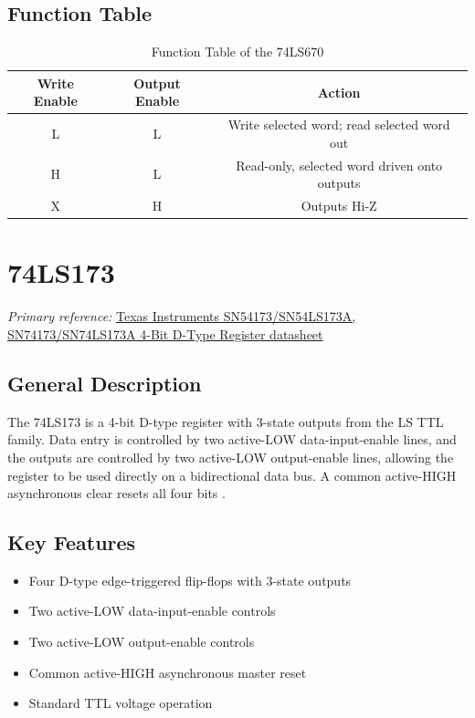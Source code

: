 \documentclass[12pt,a4paper]{report}
\newcommand{\datasheetref}[2]{%
  \noindent\textit{Primary reference:} \href{#2}{#1}%
  \par\vspace{0.6em}
}
\begin{document}
\section{Function Table}
\begin{table}[H]
\centering
\begin{tabular}{@{}ccc@{}}
\toprule
\textbf{Write Enable} & \textbf{Output Enable} & \textbf{Action} \\
\midrule
L & L & Write selected word; read selected word out \\
H & L & Read-only, selected word driven onto outputs \\
X & H & Outputs Hi-Z \\
\bottomrule
\end{tabular}
\caption{Function Table of the 74LS670}
\end{table}

\chapter{74LS173}
\datasheetref{Texas Instruments SN54173/SN54LS173A, SN74173/SN74LS173A 4-Bit D-Type Register datasheet}{https://www.ti.com/lit/ds/symlink/sn54ls173a.pdf}

\section{General Description}
The 74LS173 is a 4-bit D-type register with 3-state outputs from the LS
TTL family. Data entry is controlled by two active-LOW data-input-enable
lines, and the outputs are controlled by two active-LOW output-enable
lines, allowing the register to be used directly on a bidirectional data
bus. A common active-HIGH asynchronous clear resets all four bits
\cite{ls173}.

\section{Key Features}
\begin{itemize}
  \item Four D-type edge-triggered flip-flops with 3-state outputs
  \item Two active-LOW data-input-enable controls
  \item Two active-LOW output-enable controls
  \item Common active-HIGH asynchronous master reset
  \item Standard TTL voltage operation
\end{itemize}
\end{document}
